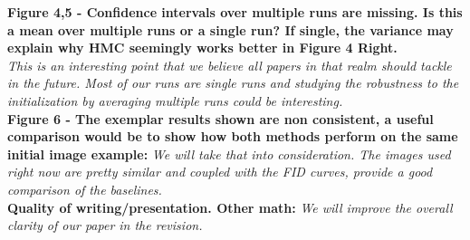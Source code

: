 \documentclass{article}
\begin{document}
\textbf{Figure 4,5 - Confidence intervals over multiple runs are missing. Is this a mean over multiple runs or a single run? If single, the variance may explain why HMC seemingly works better in Figure 4 Right.}\\
\textit{ This is an interesting point that we believe all papers in that realm should tackle in the future. Most of our runs are single runs and studying the robustness to the initialization by averaging multiple runs could be interesting.}\\
\textbf{Figure 6 - The exemplar results shown are non consistent, a useful comparison would be to show how both methods perform on the same initial image example:}
\textit{We will take that into consideration. The images used right now are pretty similar and coupled with the FID curves, provide a good comparison of the baselines.}\\
\textbf{Quality of writing/presentation. Other math:}
\textit{We will improve the overall clarity of our paper in the revision.}
\end{document}
